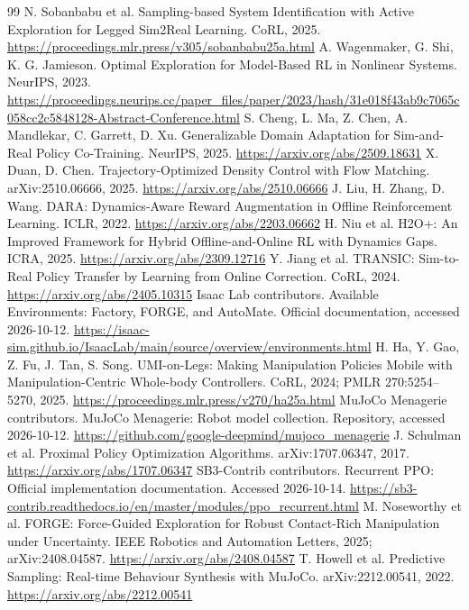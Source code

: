\documentclass[11pt]{article}
\begin{document}
\begin{thebibliography}{99}
 N. Sobanbabu et al. Sampling-based System Identification with Active Exploration for Legged Sim2Real Learning. CoRL, 2025. \url{https://proceedings.mlr.press/v305/sobanbabu25a.html}
 A. Wagenmaker, G. Shi, K. G. Jamieson. Optimal Exploration for Model-Based RL in Nonlinear Systems. NeurIPS, 2023. \url{https://proceedings.neurips.cc/paper_files/paper/2023/hash/31e018f43ab9c7065c058cc2c5848128-Abstract-Conference.html}
 S. Cheng, L. Ma, Z. Chen, A. Mandlekar, C. Garrett, D. Xu. Generalizable Domain Adaptation for Sim-and-Real Policy Co-Training. NeurIPS, 2025. \url{https://arxiv.org/abs/2509.18631}
 X. Duan, D. Chen. Trajectory-Optimized Density Control with Flow Matching. arXiv:2510.06666, 2025. \url{https://arxiv.org/abs/2510.06666}
 J. Liu, H. Zhang, D. Wang. DARA: Dynamics-Aware Reward Augmentation in Offline Reinforcement Learning. ICLR, 2022. \url{https://arxiv.org/abs/2203.06662}
 H. Niu et al. H2O+: An Improved Framework for Hybrid Offline-and-Online RL with Dynamics Gaps. ICRA, 2025. \url{https://arxiv.org/abs/2309.12716}
 Y. Jiang et al. TRANSIC: Sim-to-Real Policy Transfer by Learning from Online Correction. CoRL, 2024. \url{https://arxiv.org/abs/2405.10315}
 Isaac Lab contributors. Available Environments: Factory, FORGE, and AutoMate. Official documentation, accessed 2026-10-12. \url{https://isaac-sim.github.io/IsaacLab/main/source/overview/environments.html}
 H. Ha, Y. Gao, Z. Fu, J. Tan, S. Song. UMI-on-Legs: Making Manipulation Policies Mobile with Manipulation-Centric Whole-body Controllers. CoRL, 2024; PMLR 270:5254--5270, 2025. \url{https://proceedings.mlr.press/v270/ha25a.html}
 MuJoCo Menagerie contributors. MuJoCo Menagerie: Robot model collection. Repository, accessed 2026-10-12. \url{https://github.com/google-deepmind/mujoco_menagerie}
 J. Schulman et al. Proximal Policy Optimization Algorithms. arXiv:1707.06347, 2017. \url{https://arxiv.org/abs/1707.06347}
 SB3-Contrib contributors. Recurrent PPO: Official implementation documentation. Accessed 2026-10-14. \url{https://sb3-contrib.readthedocs.io/en/master/modules/ppo_recurrent.html}
 M. Noseworthy et al. FORGE: Force-Guided Exploration for Robust Contact-Rich Manipulation under Uncertainty. IEEE Robotics and Automation Letters, 2025; arXiv:2408.04587. \url{https://arxiv.org/abs/2408.04587}
 T. Howell et al. Predictive Sampling: Real-time Behaviour Synthesis with MuJoCo. arXiv:2212.00541, 2022. \url{https://arxiv.org/abs/2212.00541}

\end{thebibliography}
\end{document}
